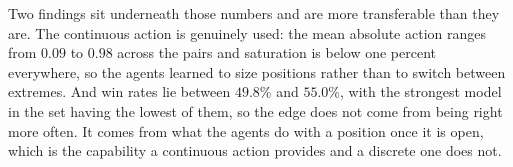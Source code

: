 Two findings sit underneath those numbers and are more transferable than they are. The continuous action is genuinely used: the mean absolute action ranges from $0.09$ to $0.98$ across the pairs and saturation is below one percent everywhere, so the agents learned to size positions rather than to switch between extremes. And win rates lie between $49.8\%$ and $55.0\%$, with the strongest model in the set having the lowest of them, so the edge does not come from being right more often. It comes from what the agents do with a position once it is open, which is the capability a continuous action provides and a discrete one does not.